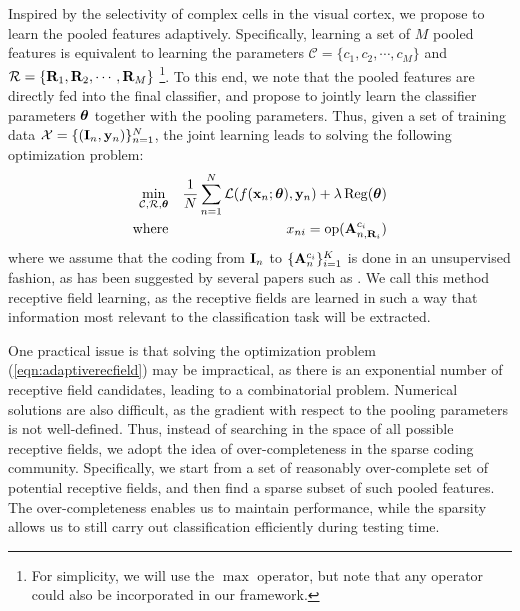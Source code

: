 Inspired by the selectivity of complex cells in the visual cortex, we propose to learn the pooled features adaptively. Specifically, learning a set of $M$ pooled features is equivalent to learning the parameters $\mathcal{C} = \{c_1,c_2,\cdots,c_M\}$ and $\mathcal{R} = \{\mathbf{R}_1,\mathbf{R}_2,\cdots,\mathbf{R}_M\}$ \footnote{For simplicity, we will use the $\max$ operator, but note that any operator could also be incorporated in our framework.}. To this end, we note that the pooled features are directly fed into the final classifier, and propose to jointly learn the classifier parameters $\boldsymbol{\theta}$ together with the pooling parameters. Thus, given a set of training data $\mathcal{X} = \{(\mathbf{I}_n,\mathbf{y}_n)\}_{n=1}^{N}$, the joint learning leads to solving the following optimization problem:
\begin{eqnarray}\label{eqn:adaptiverecfield}
  \min_{\mathcal{C},\mathcal{R},\boldsymbol{\theta}} & & \frac{1}{N}\sum_{n=1}^{N}\mathcal{L}(f(\mathbf{x}_n;\boldsymbol{\theta}),\mathbf{y}_n) + \lambda\operatorname{Reg}(\boldsymbol{\theta})\\
  \text{where} & & x_{ni} = \operatorname{op} (\mathbf{A}^{c_i}_{n,\mathbf{R}_{i}})\nonumber
\end{eqnarray}
where we assume that the coding from $\mathbf{I}_{n}$ to $\{\mathbf{A}^{c_i}_{n}\}_{i=1}^{K}$ is done in an unsupervised fashion, as has been suggested by several papers such as \cite{coates2010aistats}. We call this method receptive field learning, as the receptive fields are learned in such a way that information most relevant to the classification task will be extracted.

One practical issue is that solving the optimization problem (\ref{eqn:adaptiverecfield}) may be impractical, as there is an exponential number of receptive field candidates, leading to a combinatorial problem. Numerical solutions are also difficult, as the gradient with respect to the pooling parameters is not well-defined. Thus, instead of searching in the space of all possible receptive fields, we adopt the idea of over-completeness in the sparse coding community. Specifically, we start from a set of reasonably over-complete set of potential receptive fields, and then find a sparse subset of such pooled features. The over-completeness enables us to maintain performance, while the sparsity allows us to still carry out classification efficiently during testing time.

